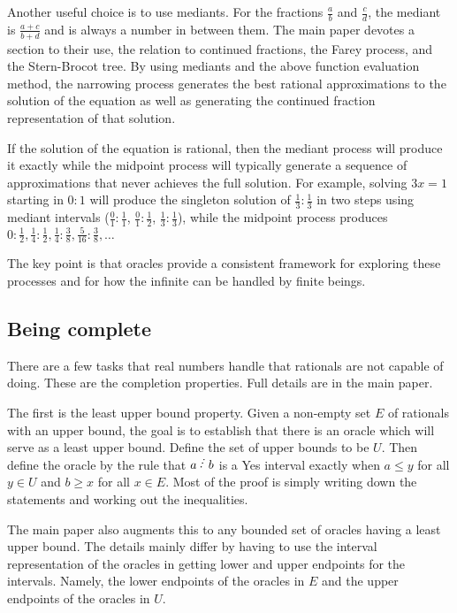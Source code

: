 \documentclass[12pt]{article}
\begin{document}
Another useful choice is to use mediants. For the fractions $\frac{a}{b}$ and $\frac{c}{d}$, the mediant is $\frac{a+c}{b+d}$ and is always a number in between them. The main paper devotes a section to their use, the relation to continued fractions, the Farey process, and the Stern-Brocot tree. By using mediants and the above function evaluation method, the narrowing process generates the best rational approximations to the solution of the equation as well as generating the continued fraction representation of that solution. 

If the solution of the equation is rational, then the mediant process will produce it exactly while the midpoint process will typically generate a sequence of approximations that never achieves the full solution. For example, solving $3x = 1$ starting in $0:1$ will produce the singleton solution of $\frac{1}{3}:\frac{1}{3}$ in two steps using mediant intervals ($\frac{0}{1}:\frac{1}{1}$, $\frac{0}{1}:\frac{1}{2}$, $\frac{1}{3}:\frac{1}{3}$), while the midpoint process produces $0:\frac{1}{2}, \frac{1}{4}: \frac{1}{2}, \frac{1}{4}: \frac{3}{8}, \frac{5}{16}: \frac{3}{8}, \ldots$

The key point is that oracles provide a consistent framework for exploring these processes and for  how the infinite can be handled by finite beings.

\subsection{Being complete}

There are a few tasks that real numbers handle that rationals are not capable of doing. These are the completion properties. Full details are in the main paper.

The first is the least upper bound property. Given a non-empty set $E$ of rationals with an upper bound, the goal is  to establish that there is an oracle which will serve as a least upper bound. Define the set of upper bounds to be $U$. Then define the oracle by the rule that $a\lte b$ is a Yes interval exactly when $a\leq y$ for all $y \in U$ and $b\geq x$ for all $x\in E$. Most of the proof is simply writing down the statements and working out the inequalities. 

The main paper also augments this to any bounded set of oracles having a least upper bound. The details mainly differ by having to use the interval representation of the oracles in getting lower and upper endpoints for the intervals. Namely, the lower endpoints of the oracles in $E$ and the upper endpoints of the oracles in $U$. 
\end{document}
